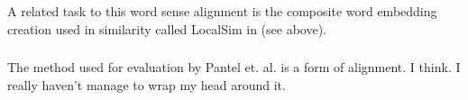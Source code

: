 \documentclass[12pt,parskip]{komatufte}
\begin{document}
A related task to this word sense alignment is the composite word embedding creation used in similarity called LocalSim in \textcite{Huang2012} (see above).



\subsubsection{\textcite {pantel2002WSI}}
The method used for evaluation by Pantel et. al. is a form of alignment. I think.
I really haven't manage to wrap my head around it.
\end{document}
